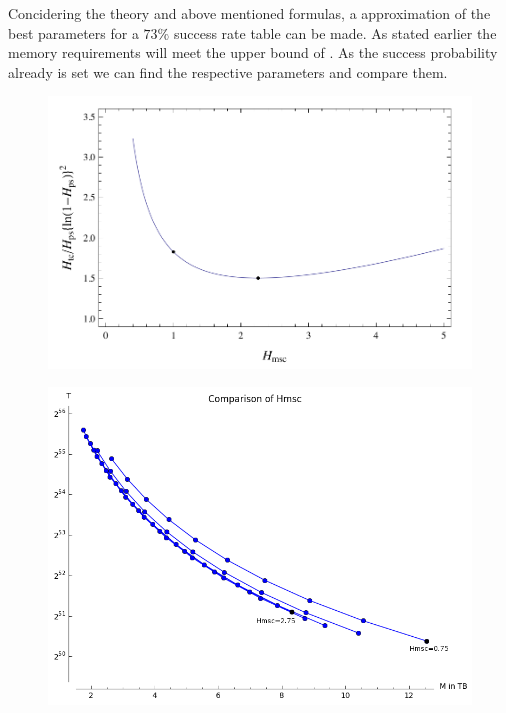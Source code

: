 Concidering the theory and above mentioned formulas, a approximation of the best parameters for a $73\%$ success rate table can be made.
As stated earlier the memory requirements will meet the upper bound of
.
As the success probability already is set we can find the respective parameters and compare them.

\begin{figure}[H]
  \centering
  \begin{minipage}{0.45\textwidth}
    \centering
    \includegraphics[width=1.2\textwidth]{figures/HellmanTradeOff.png}
    \label{fig:hellTC}
  \end{minipage}\hfill
  \begin{minipage}{0.45\textwidth}
    \centering
    \includegraphics[width=1.2\textwidth]{figures/compareHmsc.png}
    \label{fig:hellHmsc}
  \end{minipage}
\end{figure}
